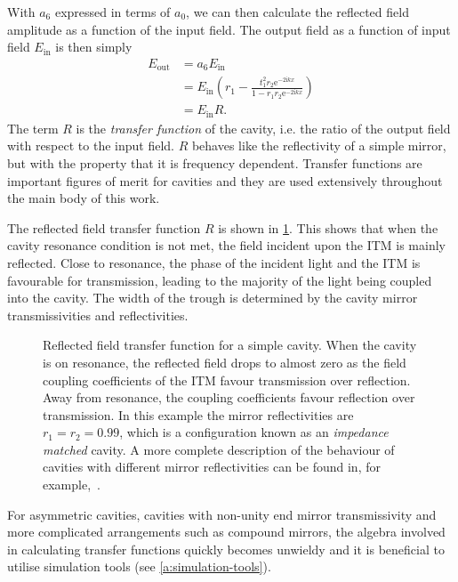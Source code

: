 With $a_6$ expressed in terms of $a_0$, we can then calculate the reflected field amplitude as a function of the input field. The output field as a function of input field $E_{\text{in}}$ is then simply
\begin{equation}
  \label{eq:fabry-perot-field}
  \begin{split}
    E_{\text{out}} &= a_6 E_{\text{in}} \\
                   &= E_{\text{in}} \left( r_1 - \frac{t_1^2 r_2 \text{e}^{-2\text{i}kx}}{1 - r_1 r_2 \text{e}^{-2\text{i}kx}} \right) \\
                   &= E_{\text{in}} R.
  \end{split}
\end{equation}
The term $R$ is the \emph{transfer function} of the cavity, i.e. the ratio of the output field with respect to the input field. $R$ behaves like the reflectivity of a simple mirror, but with the property that it is frequency dependent. Transfer functions are important figures of merit for cavities and they are used extensively throughout the main body of this work.

The reflected field transfer function $R$ is shown in \cref{fig:cavity-tf}. This shows that when the cavity resonance condition is not met, the field incident upon the \gls{ITM} is mainly reflected. Close to resonance, the phase of the incident light and the \gls{ITM} is favourable for transmission, leading to the majority of the light being coupled into the cavity. The width of the trough is determined by the cavity mirror transmissivities and reflectivities.

\begin{figure}
  \centering
  
  \caption[Reflected field transfer function for a simple \FP{} cavity]{\label{fig:cavity-tf}Reflected field transfer function for a simple \FP{} cavity. When the cavity is on resonance, the reflected field drops to almost zero as the field coupling coefficients of the ITM favour transmission over reflection. Away from resonance, the coupling coefficients favour reflection over transmission. In this example the mirror reflectivities are $r_1 = r_2 = 0.99$, which is a configuration known as an \emph{impedance matched} cavity. A more complete description of the behaviour of cavities with different mirror reflectivities can be found in, for example,~\cite{Freise2010}.}
\end{figure}

For asymmetric cavities, cavities with non-unity end mirror transmissivity and more complicated arrangements such as compound mirrors, the algebra involved in calculating transfer functions quickly becomes unwieldy and it is beneficial to utilise simulation tools (see \cref{a:simulation-tools}).

